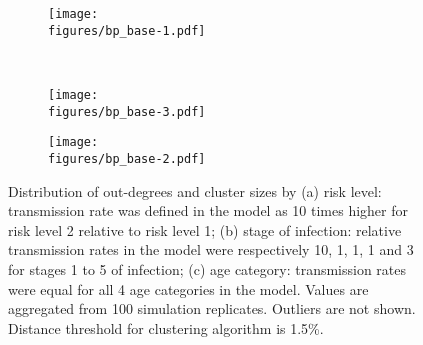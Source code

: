 \documentclass[preview]{standalone}
\newcommand{\figures}{./figure}
\begin{document}
\begin{figure}
    \centering
    \begin{subfigure}[b]{0.45\textwidth}
        \caption{}
        \texttt{[image: \\figures/bp\_base-1.pdf]}
        \label{fig1a}
    \end{subfigure}
    ~ 
    \begin{subfigure}[b]{0.45\textwidth}
        \caption{}
        \texttt{[image: \\figures/bp\_base-3.pdf]}        
        \label{fig1b}
    \end{subfigure}
    
    \begin{subfigure}[b]{0.45\textwidth}
        \caption{}
        \texttt{[image: \\figures/bp\_base-2.pdf]}        
        \label{fig1c}
    \end{subfigure}
   \caption[Distribution of out-degrees and cluster sizes by covariates]{Distribution of out-degrees and cluster sizes by (a) risk level: transmission rate was defined in the model as 10 times higher for risk level 2 relative to risk level 1; (b) stage of infection: relative transmission rates in the model were respectively 10, 1, 1, 1 and 3 for stages 1 to 5 of infection; (c) age category: transmission rates were equal for all 4 age categories in the model. Values are aggregated from 100 simulation replicates. Outliers are not shown. Distance threshold for clustering algorithm is 1.5\%.}
   \label{fig1}
\end{figure}
\end{document}
